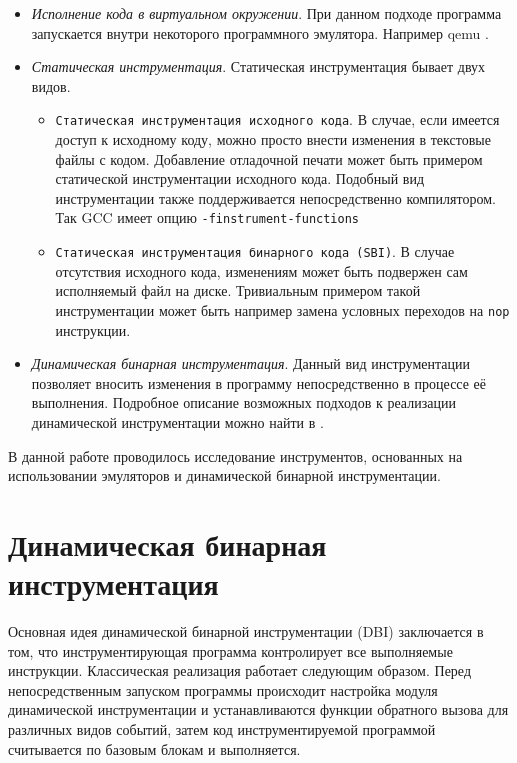\begin{itemize}
\item {\em Исполнение кода в виртуальном окружении}. При данном подходе программа запускается внутри некоторого программного эмулятора. Например qemu \cite{QEMU}.

\item {\em Статическая инструментация}.
Статическая инструментация бывает двух видов.
    \begin{itemize}
        \item \texttt{Статическая инструментация исходного кода}. В случае, если имеется доступ к исходному коду, можно просто внести изменения в текстовые файлы с кодом. Добавление отладочной печати может быть примером статической инструментации исходного кода. Подобный вид инструментации также поддерживается непосредственно компилятором. Так GCC имеет опцию  \texttt{-finstrument-functions}
        \item \texttt{Статическая инструментация бинарного кода (SBI)}. В случае отсутствия исходного кода, изменениям может быть подвержен сам исполняемый файл на диске. Тривиальным примером такой инструментации может быть например замена условных переходов на \texttt{nop} инструкции. 
    \end{itemize}

\item {\em Динамическая бинарная инструментация}. Данный вид инструментации позволяет вносить изменения в программу непосредственно в процессе её выполнения. Подробное описание возможных подходов к реализации динамической инструментации можно найти в \cite{PBA}.
\end{itemize}

В данной работе проводилось исследование инструментов, основанных на использовании эмуляторов и динамической бинарной инструментации.


\section{Динамическая бинарная инструментация}

Основная идея динамической бинарной инструментации (DBI) заключается в том, что инструментирующая программа контролирует все выполняемые инструкции. Классическая реализация работает следующим образом. Перед непосредственным запуском программы происходит настройка модуля динамической инструментации и устанавливаются функции обратного вызова для различных видов событий, затем код инструментируемой программой считывается по базовым блокам и выполняется.

